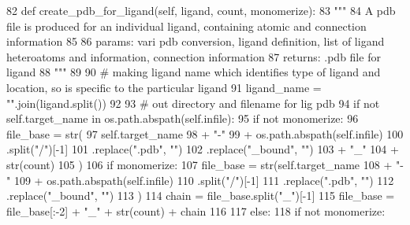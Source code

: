 \begin{DoxyCode}
82     \textcolor{keyword}{def }create\_pdb\_for\_ligand(self, ligand, count, monomerize):
83         \textcolor{stringliteral}{"""}
84 \textcolor{stringliteral}{        A pdb file is produced for an individual ligand, containing atomic and connection information}
85 \textcolor{stringliteral}{}
86 \textcolor{stringliteral}{        params: vari pdb conversion, ligand definition, list of ligand heteroatoms and information,
       connection information}
87 \textcolor{stringliteral}{        returns: .pdb file for ligand}
88 \textcolor{stringliteral}{        """}
89 
90         \textcolor{comment}{# making ligand name which identifies type of ligand and location, so is specific to the particular
       ligand}
91         ligand\_name = \textcolor{stringliteral}{""}.join(ligand.split())
92 
93         \textcolor{comment}{# out directory and filename for lig pdb}
94         \textcolor{keywordflow}{if} \textcolor{keywordflow}{not} self.target\_name \textcolor{keywordflow}{in} os.path.abspath(self.infile):
95             \textcolor{keywordflow}{if} \textcolor{keywordflow}{not} monomerize:
96                 file\_base = str(
97                     self.target\_name
98                     + \textcolor{stringliteral}{"-"}
99                     + os.path.abspath(self.infile)
100                     .split(\textcolor{stringliteral}{"/"})[-1]
101                     .replace(\textcolor{stringliteral}{".pdb"}, \textcolor{stringliteral}{""})
102                     .replace(\textcolor{stringliteral}{"\_bound"}, \textcolor{stringliteral}{""})
103                     + \textcolor{stringliteral}{"\_"}
104                     + str(count)
105                 )
106             \textcolor{keywordflow}{if} monomerize:
107                 file\_base = str(self.target\_name
108                                 + \textcolor{stringliteral}{"-"}
109                                 + os.path.abspath(self.infile)
110                                 .split(\textcolor{stringliteral}{"/"})[-1]
111                                 .replace(\textcolor{stringliteral}{".pdb"}, \textcolor{stringliteral}{""})
112                                 .replace(\textcolor{stringliteral}{"\_bound"}, \textcolor{stringliteral}{""})
113                                 )
114                 chain = file\_base.split(\textcolor{stringliteral}{"\_"})[-1]
115                 file\_base = file\_base[:-2] + \textcolor{stringliteral}{"\_"} + str(count) + chain
116 
117         \textcolor{keywordflow}{else}:
118             \textcolor{keywordflow}{if} \textcolor{keywordflow}{not} monomerize:

\end{DoxyCode}
